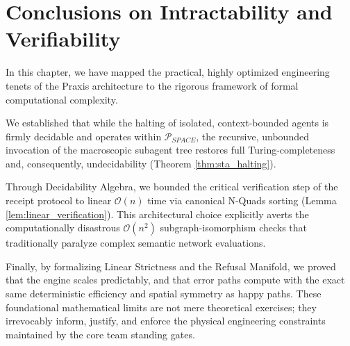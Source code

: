 \section{Conclusions on Intractability and Verifiability}

In this chapter, we have mapped the practical, highly optimized engineering tenets of the Praxis architecture to the rigorous framework of formal computational complexity. 

We established that while the halting of isolated, context-bounded agents is firmly decidable and operates within $\mathcal{P}_{SPACE}$, the recursive, unbounded invocation of the macroscopic subagent tree restores full Turing-completeness and, consequently, undecidability (Theorem \ref{thm:sta_halting}). 

Through Decidability Algebra, we bounded the critical verification step of the receipt protocol to linear $\mathcal{O}(n)$ time via canonical N-Quads sorting (Lemma \ref{lem:linear_verification}). This architectural choice explicitly averts the computationally disastrous $\mathcal{O}(n^2)$ subgraph-isomorphism checks that traditionally paralyze complex semantic network evaluations. 

Finally, by formalizing Linear Strictness and the Refusal Manifold, we proved that the engine scales predictably, and that error paths compute with the exact same deterministic efficiency and spatial symmetry as happy paths. These foundational mathematical limits are not mere theoretical exercises; they irrevocably inform, justify, and enforce the physical engineering constraints maintained by the core team standing gates.